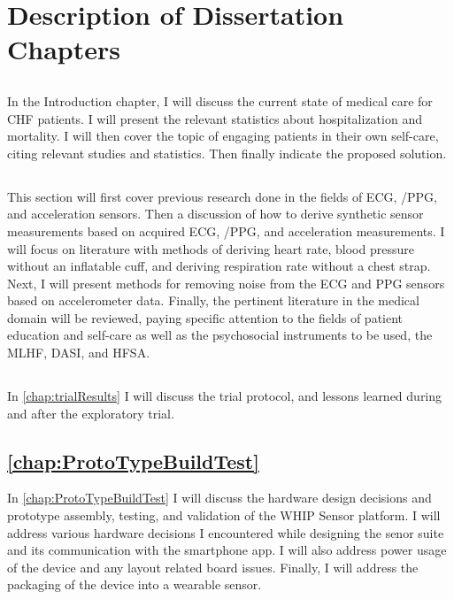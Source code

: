 \section{Description of Dissertation Chapters}

\subsection{\expandafter{ }}
\label{subsec:Chapter1Introduction}
In the Introduction chapter, I will discuss the current state of medical care for CHF patients. I will present the relevant statistics about hospitalization and mortality. I will then cover the topic of engaging patients in their own self-care, citing relevant studies and statistics. Then finally indicate the proposed solution.

\subsection{ }
\label{subsec:Chapter2LitReview}
This section will first cover previous research done in the fields of ECG,  /PPG, and acceleration sensors. Then a discussion of how to derive synthetic sensor measurements based on acquired ECG,  /PPG, and acceleration measurements. I will focus on literature with methods of deriving heart rate, blood pressure without an inflatable cuff, and deriving respiration rate without a chest strap. Next, I will present methods for removing noise from the ECG and PPG sensors based on accelerometer data. Finally, the pertinent literature in the medical domain will be reviewed, paying specific attention to the fields of patient education and self-care as well as the psychosocial instruments to be used, the MLHF, DASI, and HFSA.

\subsection{ }
\label{subsec:Chapter3SystemDesignConcepts}
In \cref{chap:trialResults} I will discuss the trial protocol, and lessons learned during and after the exploratory trial.

\subsection{\cref{chap:ProtoTypeBuildTest} }
In \cref{chap:ProtoTypeBuildTest} I will discuss the hardware design decisions and prototype assembly, testing, and validation of the WHIP Sensor platform. I will address various hardware decisions I encountered while designing the senor suite and its communication with the smartphone app. I will also address power usage of the device and any layout related board issues. Finally, I will address the packaging of the device into a wearable sensor.

